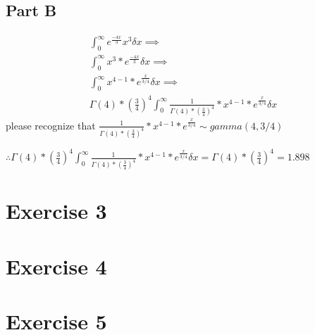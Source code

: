 \documentclass{article}\usepackage[]{graphicx}\usepackage[]{color}
\begin{document}
\subsection*{Part B}
\begin{equation}
\begin{split}
\int_{0}^{\infty}e^{\frac{-4x}{3}}x^3\delta x \implies \\
\int_{0}^{\infty}x^3*e^{\frac{-4x}{3}}\delta x \implies \\
\int_{0}^{\infty}x^{4-1}*e^{\frac{x}{3/4}}\delta x \implies \\
\Gamma(4)*(\frac{3}{4})^4\int_{0}^{\infty}\frac{1}{\Gamma(4)*(\frac{3}{4})^4}*x^{4-1}*e^{\frac{x}{3/4}}\delta x
\end{split}
\end{equation}
please recognize that $\frac{1}{\Gamma(4)*(\frac{3}{4})^4}*x^{4-1}*e^{\frac{x}{3/4}}\sim gamma(4,3/4)$

$\therefore \Gamma(4)*(\frac{3}{4})^4\int_{0}^{\infty}\frac{1}{\Gamma(4)*(\frac{3}{4})^4}*x^{4-1}*e^{\frac{x}{3/4}}\delta x = \Gamma(4)*(\frac{3}{4})^4 = 1.898$
\section*{Exercise 3}
\section*{Exercise 4}
\section*{Exercise 5}
\end{document}
